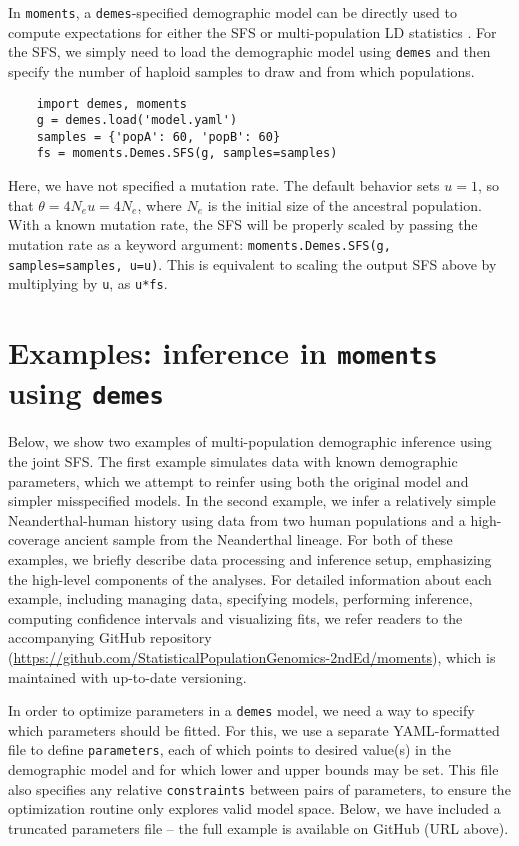 \documentclass[]{article}
\newcommand{\moments}{\texttt{moments}\xspace}
\newcommand{\demes}{\texttt{demes}\xspace}
\begin{document}
In \moments, a \demes-specified demographic model can be directly used to
compute expectations for either the SFS or multi-population LD statistics
\cite{ragsdale2019models, ragsdale2020unbiased}. For the SFS, we simply need
to load the demographic model using \demes and then specify the number of
haploid samples to draw and from which populations.
\begin{verbatim}
    import demes, moments
    g = demes.load('model.yaml')
    samples = {'popA': 60, 'popB': 60}
    fs = moments.Demes.SFS(g, samples=samples)
\end{verbatim}
Here, we have not specified a mutation rate. The default behavior sets $u=1$,
so that $\theta = 4N_eu=4N_e$, where $N_e$ is the initial size of the ancestral
population. With a known mutation rate, the SFS will be properly scaled by
passing the mutation rate as a keyword argument: \texttt{moments.Demes.SFS(g,
samples=samples, u=u)}. This is equivalent to scaling the output SFS above by
multiplying by \texttt{u}, as \texttt{u*fs}.

\section*{Examples: inference in \moments using \demes}

Below, we show two examples of multi-population demographic inference using the
joint SFS. The first example simulates data with known demographic parameters,
which we attempt to reinfer using both the original model and simpler
misspecified models. In the second example, we infer a relatively simple
Neanderthal-human history using data from two human populations and a
high-coverage ancient sample from the Neanderthal lineage. For both of these
examples, we briefly describe data processing and inference setup, emphasizing
the high-level components of the analyses. For detailed information about each
example, including managing data, specifying models, performing inference,
computing confidence intervals and visualizing fits, we refer readers to the
accompanying GitHub repository
(\url{https://github.com/StatisticalPopulationGenomics-2ndEd/moments}), which
is maintained with up-to-date versioning.

In order to optimize parameters in a \demes model, we need a way to specify
which parameters should be fitted. For this, we use a separate YAML-formatted
file to define \texttt{parameters}, each of which points to desired value(s) in
the demographic model and for which lower and upper bounds may be set. This
file also specifies any relative \texttt{constraints} between pairs of
parameters, to ensure the optimization routine only explores valid model space.
Below, we have included a truncated parameters file -- the full example is
available on GitHub (URL above).
\end{document}
